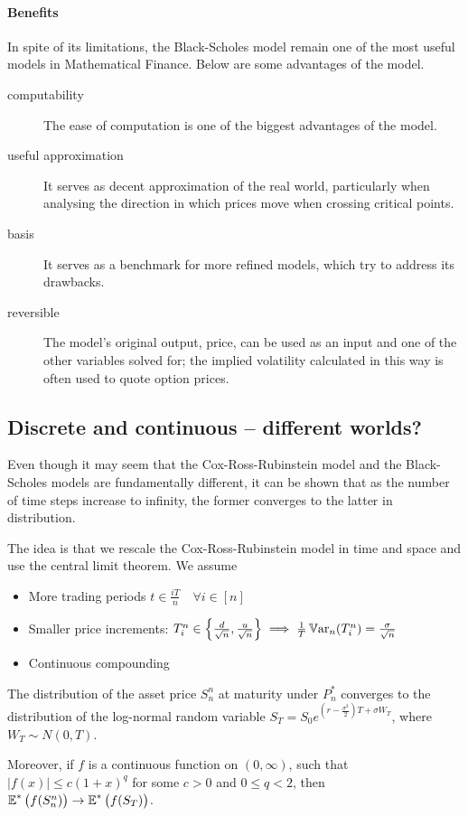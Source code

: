 \paragraph{Benefits}
In spite of its limitations, the Black-Scholes model remain one of the most useful models in Mathematical Finance. Below are some advantages of the model.
\begin{description}
	\item[computability] The ease of computation is one of the biggest advantages of the model.
	\item[useful approximation] It serves as decent approximation of the real world, particularly when analysing the direction in which prices move when crossing critical points.
	\item[basis] It serves as a benchmark for more refined models, which try to address its drawbacks.
	\item[reversible] The model's original output, price, can be used as an input and one of the other variables solved for; the implied volatility calculated in this way is often used to quote option prices.
\end{description}



\subsection{Discrete and continuous -- different worlds?}
\label{subsec:discrete-to-continuous}
Even though it may seem that the Cox-Ross-Rubinstein model and the Black-Scholes models are fundamentally different, it can be shown that as the number of time steps increase to infinity, the former converges to the latter in distribution.

The idea is that we rescale the Cox-Ross-Rubinstein model in time and space and use the central limit theorem. We assume
\begin{itemize}
	\item More trading periods $ t \in \frac{iT}{n} \quad \forall i \in [n] $
	\item Smaller price increments: $ T_i^n \in \left\lbrace \frac{d}{\sqrt{n}}, \frac{u}{\sqrt{n}} \right\rbrace  \implies  \frac{1}{T} \operatorname{\mathbb{V}\mathrm{ar}}_n (T_i^n) = \frac{\sigma}{\sqrt{n}} $
	\item Continuous compounding
\end{itemize}

\begin{thm}
	The distribution of the asset price $ S_n^n $ at maturity under $ P_n^* $ converges to the distribution of the log-normal random variable $ S_T = S_0 e^{ ( r - \frac{\sigma^2}{2} ) T + \sigma W_T } $, where $ W_T \sim N(0, T) $.
	
	Moreover, if $ f $ is a continuous function on $ (0, \infty) $, such that $ |f(x)| \le c(1+x)^q $ for some $ c > 0 $ and $ 0 \le q < 2 $, then $ \operatorname{\mathbb{E}}^* \left( f(S_n^n) \right) \to \operatorname{\mathbb{E}}^* \left( f(S_T) \right) $.
\end{thm}

